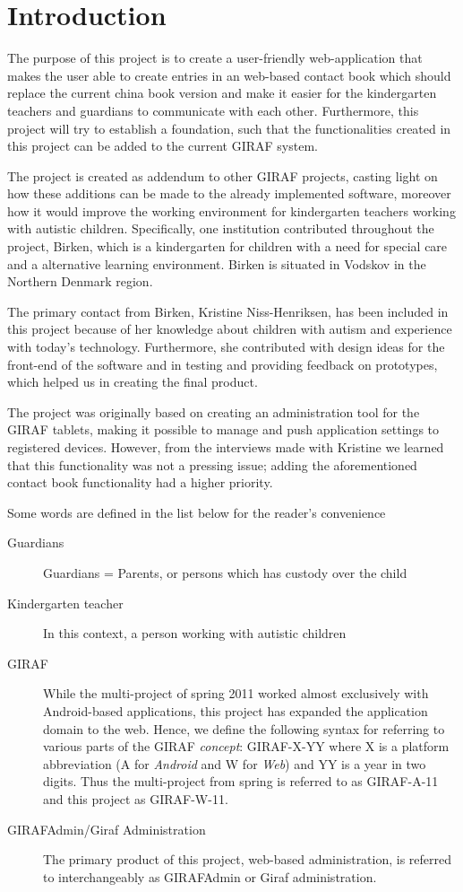 \chapter{Introduction}

The purpose of this project is to create a user-friendly web-application that makes the user able to create entries in an web-based contact book which should replace the current china book version and make it easier for the kindergarten teachers and guardians to communicate with each other. Furthermore, this project will try to establish a foundation, such that the functionalities created in this project can be added to the current GIRAF system. 

The project is created as addendum to other GIRAF projects, casting light on how these additions can be made to the already implemented software, moreover how it would improve the working environment for kindergarten teachers working with autistic children. 
Specifically, one institution contributed throughout the project, Birken, which is a kindergarten for children with a need for special care and a alternative learning environment. Birken is situated in Vodskov in the Northern Denmark region.

The primary contact from Birken, Kristine Niss-Henriksen, has been included in this project because of her knowledge about children with autism and experience with today's technology. Furthermore, she contributed with design ideas for the front-end of the software and in testing and providing feedback on prototypes, which helped us in creating the final product.

The project was originally based on creating an administration tool for the GIRAF tablets, making it possible to manage and push application settings to registered devices. However, from the interviews made with Kristine we learned that this functionality was not a pressing issue; adding the aforementioned contact book functionality had a higher priority.  

Some words are defined in the list below for the reader's convenience
\begin{description}
\item[Guardians] Guardians = Parents, or persons which has custody over the child
\item[Kindergarten teacher] In this context, a person working with autistic children
\item[GIRAF] While the multi-project of spring 2011 worked almost exclusively with Android-based applications, this project has expanded the application domain to the web. Hence, we define the following syntax for referring to various parts of the GIRAF \emph{concept}: GIRAF-X-YY where X is a platform abbreviation (A for \emph{Android} and W for \emph{Web}) and YY is a year in two digits. Thus the multi-project from spring is referred to as GIRAF-A-11 and this project as GIRAF-W-11.
\item[GIRAFAdmin/Giraf Administration] The primary product of this project, web-based administration, is referred to interchangeably as GIRAFAdmin or Giraf administration.
\end{description}